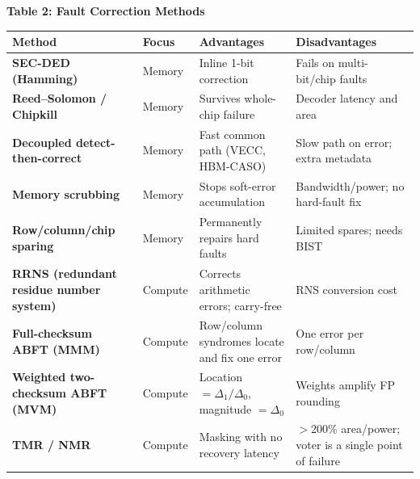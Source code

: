 \documentclass[10pt]{article}
\begin{document}
\vspace{1.0em}
\noindent\textbf{Table 2: Fault Correction Methods}
\vspace{0.25em}

{\small
	\noindent
	\begin{tabularx}{\textwidth}{@{} L{3.9cm} L{1.7cm} Y Y @{}}
		\toprule
		\textbf{Method}                                       & \textbf{Focus} & \textbf{Advantages}                                    & \textbf{Disadvantages}                                  \\
		\midrule
		\textbf{SEC-DED (Hamming)}                            & Memory         & Inline 1-bit correction                                & Fails on multi-bit/chip faults                          \\
		\textbf{Reed--Solomon / Chipkill}                     & Memory         & Survives whole-chip failure                            & Decoder latency and area                                \\
		\textbf{Decoupled detect-then-correct}                & Memory         & Fast common path (VECC, HBM-CASO)                      & Slow path on error; extra metadata                      \\
		\textbf{Memory scrubbing}                             & Memory         & Stops soft-error accumulation                          & Bandwidth/power; no hard-fault fix                      \\
		\textbf{Row/column/chip sparing}                      & Memory         & Permanently repairs hard faults                        & Limited spares; needs BIST                              \\
		\textbf{RRNS (redundant residue number system)}       & Compute        & Corrects arithmetic errors; carry-free                 & RNS conversion cost                                     \\
		\textbf{Full-checksum ABFT (MMM)}                     & Compute        & Row/column syndromes locate and fix one error          & One error per row/column                                \\
		\textbf{Weighted two-checksum ABFT (MVM)}             & Compute        & Location $= \Delta_1/\Delta_0$, magnitude $= \Delta_0$ & Weights amplify FP rounding                             \\
		\textbf{TMR / NMR}                                    & Compute        & Masking with no recovery latency                       & $>$200\% area/power; voter is a single point of failure \\

\end{tabularx}}
\end{document}
